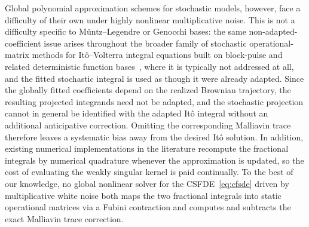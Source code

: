 \documentclass[11pt, a4paper]{article}
\theoremstyle{theoremstyle}
\theoremstyle{definitionstyle}
\begin{document}
Global polynomial approximation schemes for stochastic models, however, face a
difficulty of their own under highly nonlinear multiplicative noise. This is
not a difficulty specific to M\"untz--Legendre or Genocchi bases: the same
non-adapted-coefficient issue arises throughout the broader family of
stochastic operational-matrix methods for It\^o--Volterra integral equations
built on block-pulse and related deterministic function
bases~\cite{maleknejad2012}, where it is typically not addressed at all, and
the fitted stochastic integral is used as though it were already adapted.
Since the globally fitted coefficients depend on the realized Brownian trajectory, the
resulting projected integrands need not be adapted, and the stochastic
projection cannot in general be identified with the adapted It\^o integral
without an additional anticipative correction. Omitting the corresponding
Malliavin trace therefore leaves a systematic bias away from the desired It\^o
solution. In addition, existing numerical implementations in the literature
recompute the fractional integrals by numerical quadrature whenever the
approximation is updated, so the cost of evaluating the weakly singular kernel
is paid continually. To the best of our knowledge, no global nonlinear solver
for the CSFDE~\eqref{eq:cfsde} driven by multiplicative white noise both maps
the two fractional integrals into static operational matrices via a Fubini
contraction and computes and subtracts the exact Malliavin trace correction.
\end{document}
